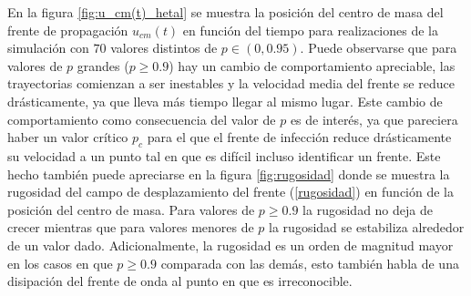 En la figura \ref{fig:u_cm(t)_hetal} se muestra la posición del centro de masa del frente de propagación $u_{cm}(t)$ en función del tiempo para
realizaciones de la simulación con $70$ valores distintos de $p\in(0,0.95)$. Puede observarse que para valores de $p$ grandes ($p\geq 0.9$) hay un cambio de comportamiento apreciable, 
las trayectorias comienzan a ser inestables y la velocidad media del frente se reduce drásticamente, ya que lleva más tiempo llegar al mismo lugar. Este cambio de 
comportamiento como consecuencia del valor de $p$ es de interés, ya que pareciera haber un valor crítico $p_c$
para el que el frente de infección reduce drásticamente su velocidad a un punto tal en que es difícil incluso identificar un frente. Este hecho también puede 
apreciarse en la figura \ref{fig:rugosidad} donde se muestra la rugosidad del campo de desplazamiento del frente (\ref{rugosidad}) en función de la posición del 
centro de masa. Para valores de $p\geq 0.9$ la rugosidad no deja de crecer mientras que para valores menores de $p$ 
la rugosidad se estabiliza alrededor de un valor dado. Adicionalmente, la rugosidad es un orden de magnitud mayor en los casos en que $p\geq 0.9$ comparada con las 
demás, esto también habla de una disipación del frente de onda al punto en que es irreconocible.

